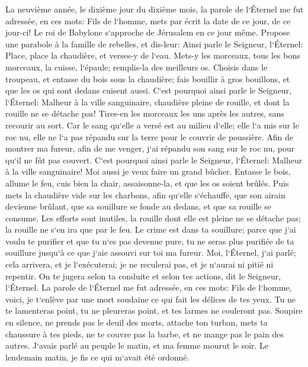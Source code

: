 \verse La neuvième année, le dixième jour du dixième mois, la parole de l`Éternel me fut adressée, en ces mots: 
\verse Fils de l`homme, mets par écrit la date de ce jour, de ce jour-ci! Le roi de Babylone s`approche de Jérusalem en ce jour même. 
\verse Propose une parabole à la famille de rebelles, et dis-leur: Ainsi parle le Seigneur, l`Éternel: Place, place la chaudière, et verses-y de l`eau. 
\verse Mets-y les morceaux, tous les bons morceaux, la cuisse, l`épaule; remplis-la des meilleurs os. 
\verse Choisis dans le troupeau, et entasse du bois sous la chaudière; fais bouillir à gros bouillons, et que les os qui sont dedans cuisent aussi. 
\verse C`est pourquoi ainsi parle le Seigneur, l`Éternel: Malheur à la ville sanguinaire, chaudière pleine de rouille, et dont la rouille ne se détache pas! Tires-en les morceaux les uns après les autres, sans recourir au sort. 
\verse Car le sang qu`elle a versé est au milieu d`elle; elle l`a mis sur le roc nu, elle ne l`a pas répandu sur la terre pour le couvrir de poussière. 
\verse Afin de montrer ma fureur, afin de me venger, j`ai répandu son sang sur le roc nu, pour qu`il ne fût pas couvert. 
\verse C`est pourquoi ainsi parle le Seigneur, l`Éternel: Malheur à la ville sanguinaire! Moi aussi je veux faire un grand bûcher. 
\verse Entasse le bois, allume le feu, cuis bien la chair, assaisonne-la, et que les os soient brûlés. 
\verse Puis mets la chaudière vide sur les charbons, afin qu`elle s`échauffe, que son airain devienne brûlant, que sa souillure se fonde au dedans, et que sa rouille se consume. 
\verse Les efforts sont inutiles, la rouille dont elle est pleine ne se détache pas; la rouille ne s`en ira que par le feu. 
\verse Le crime est dans ta souillure; parce que j`ai voulu te purifier et que tu n`es pas devenue pure, tu ne seras plus purifiée de ta souillure jusqu`à ce que j`aie assouvi sur toi ma fureur. 
\verse Moi, l`Éternel, j`ai parlé; cela arrivera, et je l`exécuterai; je ne reculerai pas, et je n`aurai ni pitié ni repentir. On te jugera selon ta conduite et selon tes actions, dit le Seigneur, l`Éternel. 
\verse La parole de l`Éternel me fut adressée, en ces mots: 
\verse Fils de l`homme, voici, je t`enlève par une mort soudaine ce qui fait les délices de tes yeux. Tu ne te lamenteras point, tu ne pleureras point, et tes larmes ne couleront pas. 
\verse Soupire en silence, ne prends pas le deuil des morts, attache ton turban, mets ta chaussure à tes pieds, ne te couvre pas la barbe, et ne mange pas le pain des autres. 
\verse J`avais parlé au peuple le matin, et ma femme mourut le soir. Le lendemain matin, je fis ce qui m`avait été ordonné. 
